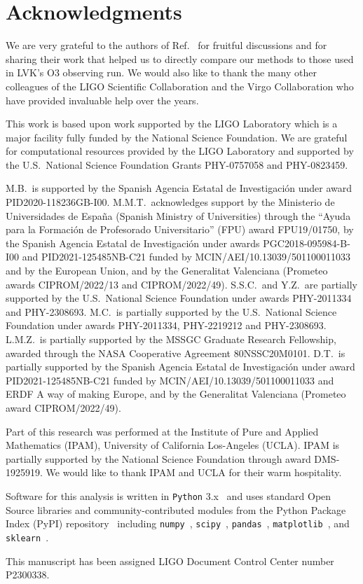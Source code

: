 \section*{Acknowledgments}

We are very grateful to the authors of Ref.~\cite{Chatterjee:2019avs} for fruitful discussions and for sharing their work that helped us to directly compare
our methods to those used in \ac{LVK}'s \ac{O3} observing run. We would also like to thank the many other colleagues of the LIGO Scientific Collaboration and
the Virgo Collaboration who have provided invaluable help over the years.

This work is based upon work supported by the LIGO Laboratory which is a major facility fully funded by the National Science Foundation. We are grateful for computational resources provided by
the LIGO Laboratory and supported by the U.S.\ National Science Foundation Grants PHY-0757058 and PHY-0823459. 

M.B.\ is supported by the Spanish Agencia Estatal de Investigaci\'on under award PID2020-118236GB-I00. M.M.T.\ acknowledges support by the Ministerio de Universidades de Espa\~na (Spanish
Ministry of Universities) through the ``Ayuda para la Formaci\'on de Profesorado Universitario'' (FPU) award FPU19/01750, by the Spanish Agencia Estatal de Investigaci\'on under awards
PGC2018-095984-B-I00 and PID2021-125485NB-C21 funded by MCIN/AEI/10.13039/501100011033 and by the European Union, and by the Generalitat Valenciana (Prometeo awards CIPROM/2022/13 and
CIPROM/2022/49). S.S.C.\ and Y.Z.\ are partially supported by the U.S.\ National Science Foundation under awards PHY-2011334 and PHY-2308693. M.C.\ is partially supported by the U.S.\ National
Science Foundation under awards PHY-2011334, PHY-2219212 and PHY-2308693. L.M.Z.\ is partially supported by the MSSGC Graduate Research Fellowship, awarded through the NASA Cooperative
Agreement 80NSSC20M0101. D.T.~is partially supported by the Spanish Agencia Estatal de Investigaci\'on under award PID2021-125485NB-C21 funded by MCIN/AEI/10.13039/501100011033 and ERDF A way
of making Europe, and by the Generalitat Valenciana (Prometeo award CIPROM/2022/49).

Part of this research was performed at the Institute of Pure and Applied Mathematics (IPAM),  University of California Los-Angeles (UCLA). IPAM is partially supported by the National Science
Foundation through award DMS-1925919. We would like to thank IPAM and UCLA for their warm hospitality. 

Software for this analysis is written in \texttt{Python} 3.x~\cite{python3} and uses standard Open Source libraries and community-contributed modules from the Python Package Index (PyPI)
repository~\cite{pypi} including \texttt{numpy}~\cite{harris2020array}, \texttt{scipy}~\cite{2020SciPy-NMeth}, \texttt{pandas}~\cite{reback2020pandas,mckinney-proc-scipy-2010},
\texttt{matplotlib}~\cite{Hunter:2007ouj}, and \texttt{sklearn}~\cite{scikit-learn}.

This manuscript has been assigned LIGO Document Control Center number P2300338.





